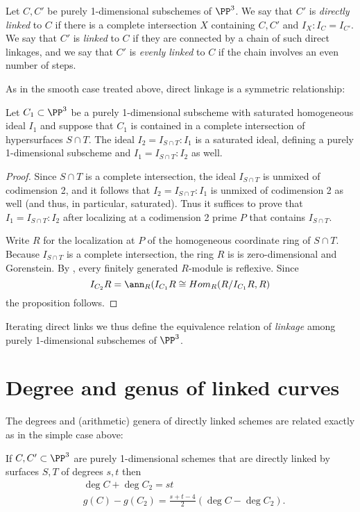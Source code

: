 \begin{definition}
Let $C,C'$ be purely 1-dimensional subschemes of $\PP^3$. We say that $C'$ is \emph{directly linked} to $C$ if there is a complete
intersection $X$ containing $C,C'$ and $I_X:I_C = I_{C'}$. We say that $C'$ is \emph{linked} to $C$ if they are connected by a chain of such
direct linkages, and we say that $C'$ is \emph{evenly linked} to $C$ if the chain involves an even number of steps.
\end{definition}

As in the smooth case treated above, direct linkage is a symmetric relationship:
\begin{proposition}
Let $C_1\subset \PP^3$ be a purely 1-dimensional subscheme with saturated homogeneous ideal $I_1$ and suppose that $C_1$ is contained in a complete intersection of
hypersurfaces $S\cap T$. The ideal $I_2 = I_{S\cap T}:I_1$ is a saturated ideal, defining a purely 1-dimensional subscheme and 
$I_1 = I_{S\cap T}: I_2$ as well.
\end{proposition}
 
\begin{proof}
Since $S\cap T$ is a complete intersection, the ideal $I_{S\cap T}$ is unmixed of codimension 2, and it follows
that $I_2 = I_{S\cap T}:I_1$ is unmixed of codimension 2 as well (and thus, in particular, saturated).
Tnus it suffices to prove that $I_1 = I_{S\cap T}: I_2$ after localizing at a codimension 2 prime $P$
that contains $I_{S\cap T}$. 

Write $R$ for the localization at $P$ of the homogeneous coordinate ring of $S\cap T$. 
Because $I_{S\cap T}$ is a complete intersection, the ring $R$ is
 is zero-dimensional and Gorenstein.
By \cite[***]{Eisenbud1995}, every finitely generated $R$-module is reflexive. Since 
$$
I_{C_2}R= \ann_{R}(I_{C_1}R \cong Hom_R(R/I_{C_1}R, R)
$$
the proposition follows.
\end{proof}

Iterating direct links we thus define the equivalence relation of \emph{linkage} among purely 1-dimensional subschemes
of $\PP^3$.

\section{Degree and genus of linked curves}

The degrees and (arithmetic) genera 
of directly linked schemes are related exactly as in the simple case above:

\begin{theorem}\label{direct linkage}\label{linked genus formula}
If $C,{C'}\subset \PP^3$ are purely 1-dimensional schemes that are directly linked by surfaces $S,T$ of degrees $s,t$  then 
$$
\begin{aligned}
&\deg C+\deg C_2 = st\\
&g(C) - g({C_2}) = \frac{s+t-4}{2}(\deg C-\deg {C_2}).
\end{aligned}
 $$
\end{theorem}

